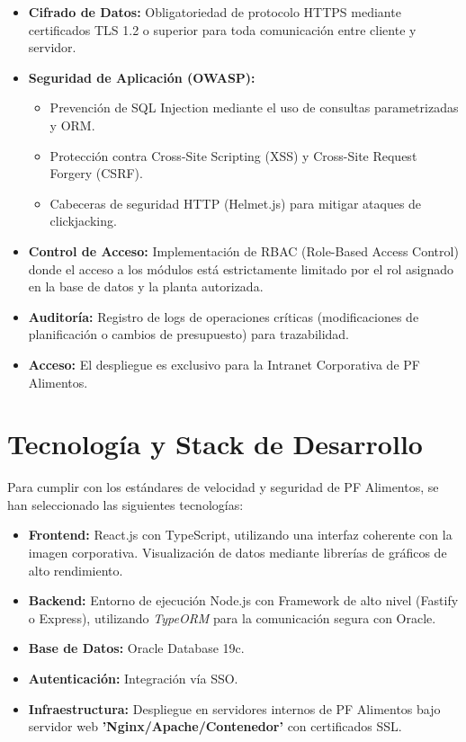 \documentclass[11pt, letterpaper]{article}
\begin{document}
\begin{itemize}
    \item \textbf{Cifrado de Datos:} Obligatoriedad de protocolo HTTPS mediante certificados TLS 1.2 o superior para toda comunicación entre cliente y servidor.
    \item \textbf{Seguridad de Aplicación (OWASP):} 
    \begin{itemize}
        \item Prevención de SQL Injection mediante el uso de consultas parametrizadas y ORM.
        \item Protección contra Cross-Site Scripting (XSS) y Cross-Site Request Forgery (CSRF).
        \item Cabeceras de seguridad HTTP (Helmet.js) para mitigar ataques de clickjacking.
    \end{itemize}
    \item \textbf{Control de Acceso:} Implementación de RBAC (Role-Based Access Control) donde el acceso a los módulos está estrictamente limitado por el rol asignado en la base de datos y la planta autorizada.
    \item \textbf{Auditoría:} Registro de logs de operaciones críticas (modificaciones de planificación o cambios de presupuesto) para trazabilidad.
    \item \textbf{Acceso:} El despliegue es exclusivo para la Intranet Corporativa de PF Alimentos.
\end{itemize}




\section{Tecnología y Stack de Desarrollo}

Para cumplir con los estándares de velocidad y seguridad de PF Alimentos, se han seleccionado las siguientes tecnologías:

\begin{itemize}
    \item \textbf{Frontend:} React.js con TypeScript, utilizando una interfaz coherente con la imagen corporativa. Visualización de datos mediante librerías de gráficos de alto rendimiento.
    \item \textbf{Backend:} Entorno de ejecución Node.js con Framework de alto nivel (Fastify o Express), utilizando \textit{TypeORM} para la comunicación segura con Oracle.
    \item \textbf{Base de Datos:} Oracle Database 19c.
    \item \textbf{Autenticación:} Integración vía SSO.
    \item \textbf{Infraestructura:} Despliegue en servidores internos de PF Alimentos bajo servidor web \textbf{'Nginx/Apache/Contenedor'} con certificados SSL.
\end{itemize}
\end{document}
